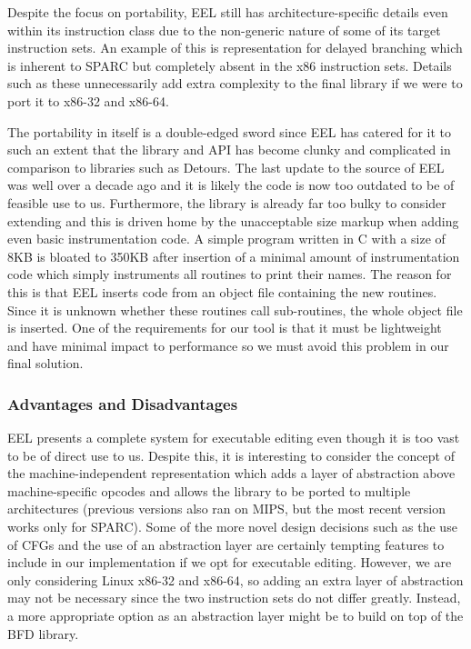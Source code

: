 Despite the focus on portability, EEL still has architecture-specific details even within its instruction class due to the non-generic nature of some of its target instruction sets. An example of this is representation for delayed branching which is inherent to SPARC but completely absent in the x86 instruction sets. Details such as these unnecessarily add extra complexity to the final library if we were to port it to x86-32 and x86-64.

The portability in itself is a double-edged sword since EEL has catered for it to such an extent that the library and API has become clunky and complicated in comparison to libraries such as Detours. The last update to the source of EEL was well over a decade ago and it is likely the code is now too outdated to be of feasible use to us. Furthermore, the library is already far too bulky to consider extending and this is driven home by the unacceptable size markup when adding even basic instrumentation code. A simple program written in C with a size of 8KB is bloated to 350KB after insertion of a minimal amount of instrumentation code which simply instruments all routines to print their names\cite{leel}. The reason for this is that EEL inserts code from an object file containing the new routines. Since it is unknown whether these routines call sub-routines, the whole object file is inserted. One of the requirements for our tool is that it must be lightweight and have minimal impact to performance so we must avoid this problem in our final solution.

\subsubsection{Advantages and Disadvantages}

EEL presents a complete system for executable editing even though it is too vast to be of direct use to us. Despite this, it is interesting to consider the concept of the machine-independent representation which adds a layer of abstraction above machine-specific opcodes and allows the library to be ported to multiple architectures (previous versions also ran on MIPS, but the most recent version works only for SPARC). Some of the more novel design decisions such as the use of CFGs and the use of an abstraction layer are certainly tempting features to include in our implementation if we opt for executable editing. However, we are only considering Linux x86-32 and x86-64, so adding an extra layer of abstraction may not be necessary since the two instruction sets do not differ greatly. Instead, a more appropriate option as an abstraction layer might be to build on top of the BFD library.

